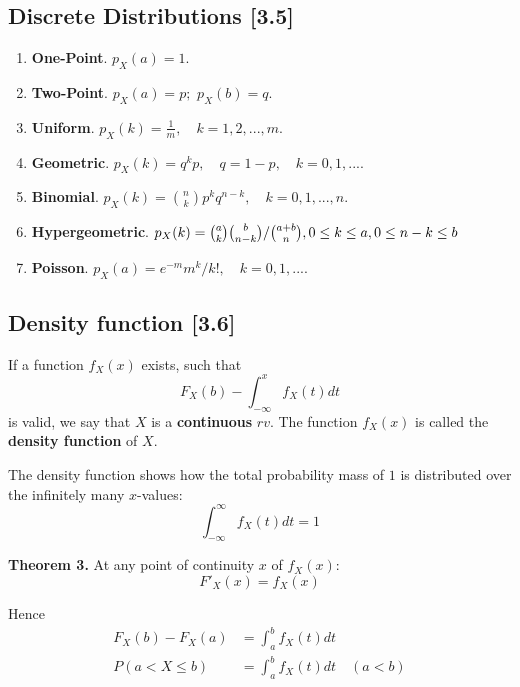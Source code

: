 \documentclass[a4paper,9pt]{extarticle}
\begin{document}
\begin{multicols*}{2}
\subsection{Discrete Distributions [3.5]}
\begin{enumerate}[label=\bfseries (\alph*)]
    \item \textbf{One-Point}. $p_X(a) = 1$.
    \item \textbf{Two-Point}. $p_X(a) = p;$ $p_X(b) = q$.
    \item \textbf{Uniform}. $p_X(k) = \frac{1}{m}, \quad k = 1,2, ..., m$.
    \item \textbf{Geometric}. $p_X(k) = q^k p, \quad q = 1-p, \quad k = 0,1, ...$.
    \item \textbf{Binomial}. $p_X(k) = \binom{n}{k} p^k q^{n-k}, \quad k = 0,1, ..., n$.
    \item \textbf{Hypergeometric}. $p_X(k) = \binom{a}{k} \binom{b}{n-k} / \binom{a + b}{n}, \\ 0 \leq k \leq a, 0 \leq n - k  \leq b$
    \item \textbf{Poisson}. $p_X(a) = e^{-m} m^k / k!, \quad k = 0, 1, ...$.
\end{enumerate}

\subsection{Density function [3.6]}
If a function $f_X(x)$ exists, such that
\begin{equation} \label{3.6.1}
    F_X(b) - \int_{-\infty}^{x} f_X(t) dt
\end{equation} is valid, we say that $X$ is a \textbf{continuous} $rv$. The function $f_X(x)$ is called the \textbf{density function} of $X$.

The density function shows how the total probability mass of $1$ is distributed over the infinitely many $x$-values:
\begin{equation} \label{3.6.2}
    \int_{-\infty}^{\infty} f_X(t) dt = 1
\end{equation}


\textbf{Theorem 3.} At any point of continuity $x$ of $f_X(x)$:
\begin{equation} \label{3.6.3}
    F'_X(x) = f_X(x)
\end{equation}

Hence
\begin{equation}
    \begin{split}
        F_X(b) - F_X(a) & = \int_a^b f_X(t) dt \\
        P(a < X \leq b) & = \int_a^b f_X(t) dt \quad (a < b)
    \end{split}
\end{equation}


\end{multicols*}
\end{document}
